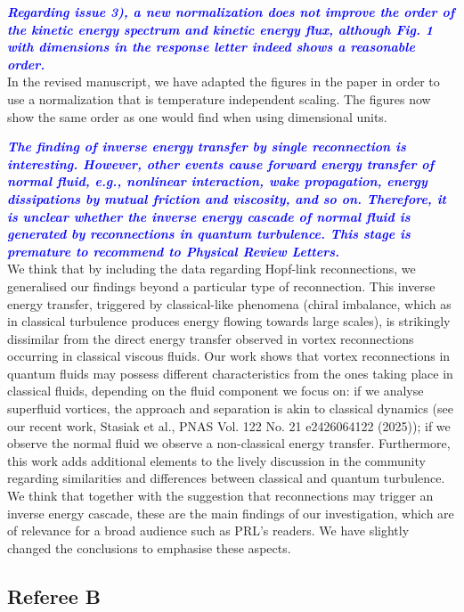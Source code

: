 \documentclass[a4paper,10pt]{article}
\def\blue#1{\textcolor{blue}{#1}}
\def\refcomment#1{\textbf{\blue{\emph{#1}}}\\}
\newcommand*{\CHANGE}[1]{{\color{magenta}#1}}
\begin{document}
\refcomment{Regarding issue 3), a new normalization does not improve
the order of the kinetic energy spectrum and kinetic energy flux,
although Fig. 1 with dimensions in the response letter indeed shows a
reasonable order.}

In the revised manuscript, we have adapted the figures in the paper in order to use a normalization that is temperature independent scaling. %
The figures now show the same order as one would find when using dimensional units. 

\refcomment{The finding of inverse energy transfer by single reconnection is
interesting. However, other events cause forward energy transfer of
normal fluid, e.g., nonlinear interaction, wake propagation, energy
dissipations by mutual friction and viscosity, and so on. Therefore,
it is unclear whether the inverse energy cascade of normal fluid is
generated by reconnections in quantum turbulence. This stage is
premature to recommend to Physical Review Letters.}

\CHANGE{We think that by including the data regarding Hopf-link reconnections, we generalised our findings beyond a particular type of reconnection. This inverse energy transfer,
triggered by classical-like phenomena (chiral imbalance, which as in classical turbulence produces energy flowing towards large scales), is strikingly dissimilar from 
the direct energy transfer observed in vortex reconnections occurring in classical viscous fluids. Our work shows that vortex reconnections in quantum fluids may possess 
different characteristics from the ones taking place in classical fluids, depending on the fluid component we focus on: if we analyse superfluid vortices, the approach and 
separation is akin to classical dynamics (see our recent work, Stasiak et al., PNAS Vol. 122 No. 21 e2426064122 (2025)); if we observe the normal fluid we observe a non-classical 
energy transfer. Furthermore, this work adds additional elements to the lively discussion in the community regarding similarities and differences between classical and quantum 
turbulence. We think that together with the suggestion that reconnections may trigger an inverse energy cascade, these are the main findings of our investigation, which are of 
relevance for a broad audience such as PRL's readers. We have slightly changed the conclusions to emphasise these aspects.}

\subsection*{Referee B}
\end{document}
